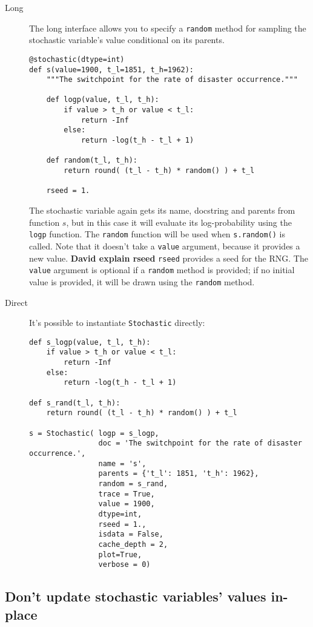 \begin{description}
    \item[Long] The long interface allows you to specify a \texttt{random} method for sampling the stochastic variable's value conditional on its parents.
    \begin{verbatim}
@stochastic(dtype=int)
def s(value=1900, t_l=1851, t_h=1962):
    """The switchpoint for the rate of disaster occurrence."""

    def logp(value, t_l, t_h):
        if value > t_h or value < t_l:
            return -Inf
        else:
            return -log(t_h - t_l + 1) 
            
    def random(t_l, t_h):
        return round( (t_l - t_h) * random() ) + t_l

    rseed = 1.
    \end{verbatim}
The stochastic variable again gets its name, docstring and parents from function $s$, but in this case it will evaluate its log-probability using the \texttt{logp} function. The \texttt{random} function will be used when \texttt{s.random()} is called. Note that it doesn't take a \texttt{value} argument, because it provides a new value. \textbf{David explain rseed} \texttt{rseed} provides a seed for the RNG. The \texttt{value} argument is optional if a \texttt{random} method is provided; if no initial value is provided, it will be drawn using the \texttt{random} method.

    \item[Direct] It's possible to instantiate \texttt{Stochastic} directly:
\begin{verbatim}
def s_logp(value, t_l, t_h):
    if value > t_h or value < t_l:
        return -Inf
    else:
        return -log(t_h - t_l + 1) 

def s_rand(t_l, t_h):
    return round( (t_l - t_h) * random() ) + t_l

s = Stochastic( logp = s_logp, 
                doc = 'The switchpoint for the rate of disaster occurrence.',
                name = 's', 
                parents = {'t_l': 1851, 't_h': 1962},
                random = s_rand,                 
                trace = True,                 
                value = 1900,
                dtype=int,
                rseed = 1., 
                isdata = False,
                cache_depth = 2,
                plot=True,
                verbose = 0)
\end{verbatim}
\end{description}

\hypertarget{sub:warning}{}
\subsection*{Don't update stochastic variables' values in-place} \label{sub:warning}

